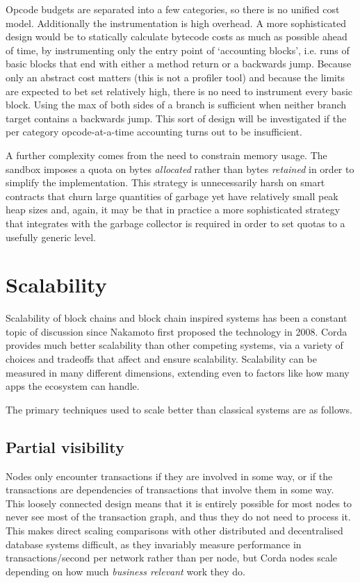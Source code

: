 \documentclass{article}
\begin{document}
Opcode budgets are separated into a few categories, so there is no unified cost model. Additionally the instrumentation is
high overhead. A more sophisticated design would be to statically calculate bytecode costs as much as possible
ahead of time, by instrumenting only the entry point of `accounting blocks', i.e. runs of basic blocks that end
with either a method return or a backwards jump. Because only an abstract cost matters (this is not a profiler
tool) and because the limits are expected to bet set relatively high, there is no need to instrument every basic
block. Using the max of both sides of a branch is sufficient when neither branch target contains a backwards jump.
This sort of design will be investigated if the per category opcode-at-a-time accounting turns out to be
insufficient.

A further complexity comes from the need to constrain memory usage. The sandbox imposes a quota on bytes
\emph{allocated} rather than bytes \emph{retained} in order to simplify the implementation. This strategy is
unnecessarily harsh on smart contracts that churn large quantities of garbage yet have relatively small peak heap
sizes and, again, it may be that in practice a more sophisticated strategy that integrates with the garbage
collector is required in order to set quotas to a usefully generic level.

\section{Scalability}

Scalability of block chains and block chain inspired systems has been a constant topic of discussion since Nakamoto
first proposed the technology in 2008. Corda provides much better scalability than other competing systems, via a
variety of choices and tradeoffs that affect and ensure scalability. Scalability can be measured in many different
dimensions, extending even to factors like how many apps the ecosystem can handle.

The primary techniques used to scale better than classical systems are as follows.

\subsection{Partial visibility}

Nodes only encounter transactions if they are involved in some way, or if the transactions are dependencies of
transactions that involve them in some way. This loosely connected design means that it is entirely possible for
most nodes to never see most of the transaction graph, and thus they do not need to process it. This makes direct
scaling comparisons with other distributed and decentralised database systems difficult, as they invariably measure
performance in transactions/second per network rather than per node, but Corda nodes scale depending on how much
\emph{business relevant} work they do.
\end{document}
